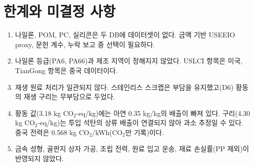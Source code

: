 \documentclass[10pt,a4paper]{article}
\begin{document}
\section{한계와 미결정 사항}
\begin{enumerate}[leftmargin=14pt,itemsep=1pt]
\item 나일론, POM, PC, 실리콘은 두 DB에 데이터셋이 없다. 금액 기반 USEEIO proxy, 문헌 계수, 누락 보고 중 선택이 필요하다.
\item 나일론 등급(PA6, PA66)과 제조 지역이 정해지지 않았다. USLCI 항목은 미국, TianGong 항목은 중국 데이터이다.
\item 재생 원료 처리가 일관되지 않다. 스테인리스 스크랩은 부담을 유지했고(D6) 황동의 재생 구리는 무부담으로 두었다.
\item 황동 값({3.18} kg CO$_2$-eq/kg)에는 아연 0.35 kg/kg의 배출이 빠져 있다. 구리({4.30} kg CO$_2$-eq/kg)는 투입 석탄의 상류 배출이 연결되지 않아 과소 추정일 수 있다. 중국 전력은 {0.568} kg CO$_2$/kWh(CO$_2$만 기록)이다.
\item 금속 성형, 골판지 상자 가공, 조립 전력, 원료 입고 운송, 재료 손실률(PP 제외)이 반영되지 않았다.
\end{enumerate}
\end{document}
